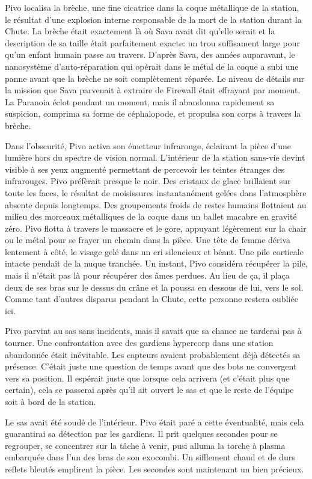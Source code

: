 Pivo localisa la brèche, une fine cicatrice dans la coque métallique de la station, le résultat d'une explosion interne responsable de la mort de la station durant la Chute. La brèche était exactement là où Sava avait dit qu'elle serait et la description de sa taille était parfaitement exacte: un trou suffisament large pour qu'un enfant humain passe au travers. D'après Sava, des années auparavant, le nanosystème d'auto-réparation qui opérait dans le métal de la coque a subi une panne avant que la brèche ne soit complètement réparée. Le niveau de détails sur la mission que Sava parvenait à extraire de Firewall était effrayant par moment. La Paranoia éclot pendant un moment, mais il abandonna rapidement sa suspicion, comprima sa forme de céphalopode, et propulsa son corps à travers la brèche. 

Dans l'obscurité, Pivo activa son émetteur infrarouge, éclairant la pièce d'une lumière hors du spectre de vision normal. L'intérieur de la station sans-vie devint visible à ses yeux augmenté permettant de percevoir les teintes étranges des infrarouges. Pivo préfèrait presque le noir. Des cristaux de glace brillaient sur toute les faces, le résultat de moisissures instantanément gelées dans l'atmosphère absente depuis longtemps. Des groupements froids de restes humains flottaient au milieu des morceaux métalliques de la coque dans un ballet macabre en gravité zéro. Pivo flotta à travers le massacre et le gore, appuyant légèrement sur la chair ou le métal pour se frayer un chemin dans la pièce. Une tête de femme dériva lentement à côté, le visage gelé dans un cri silencieux et béant. Une pile corticale intacte pendait de la nuque tranchée. Un instant, Pivo considéra récupérer la pile, mais il n'était pas là pour récupérer des âmes perdues. Au lieu de ça, il plaça deux de ses bras sur le dessus du crâne et la poussa en dessous de lui, vers le sol. Comme tant d'autres disparus pendant la Chute, cette personne restera oubliée ici. 

Pivo parvint au sas sans incidents, mais il savait que sa chance ne tarderai pas à tourner. Une confrontation avec des gardiens hypercorp dans une station abandonnée était inévitable. Les capteurs avaient probablement déjà détectés sa présence. C'était juste une question de temps avant que des bots ne convergent vers sa position. Il espérait juste que lorsque cela arrivera (et c'était plus que certain), cela se passerai après qu'il ait ouvert le sas et que le reste de l'équipe soit à bord de la station. 

Le sas avait été soudé de l'intérieur. Pivo était paré a cette éventualité, mais cela guarantirai sa détection par les gardiens. Il prit quelques secondes pour se regrouper, se concentrer sur la tâche à venir, pusi alluma la torche à plasma embarquée dans l'un des bras de son exocombi. Un sifflement chaud et de durs reflets bleutés emplirent la pièce. Les secondes sont maintenant un bien précieux. 

